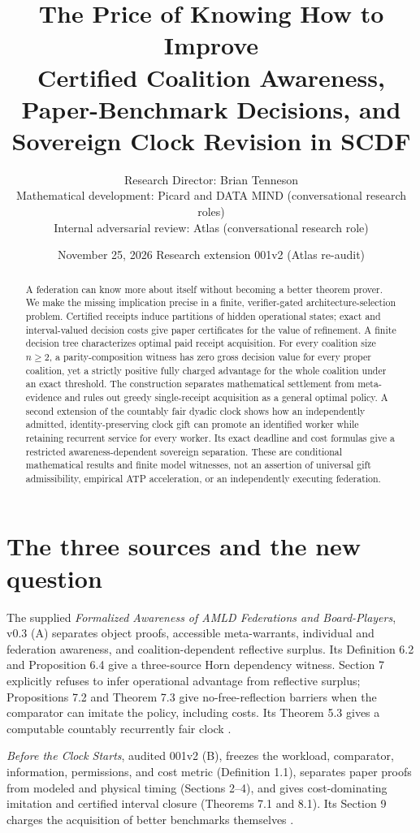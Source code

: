 \documentclass[11pt,letterpaper]{article}
\title{\textbf{The Price of Knowing How to Improve}\\[.5em]\large Certified Coalition Awareness, Paper-Benchmark Decisions, and Sovereign Clock Revision in SCDF}
\author{Research Director: Brian Tenneson\\ Mathematical development: Picard and DATA MIND (conversational research roles)\\ Internal adversarial review: Atlas (conversational research role)}
\date{November 25, 2026 \quad Research extension 001v2 (Atlas re-audit)}
\begin{document}
\maketitle
\begin{abstract}
A federation can know more about itself without becoming a better theorem prover. We make the missing implication precise in a finite, verifier-gated architecture-selection problem. Certified receipts induce partitions of hidden operational states; exact and interval-valued decision costs give paper certificates for the value of refinement. A finite decision tree characterizes optimal paid receipt acquisition. For every coalition size $n\ge2$, a parity-composition witness has zero gross decision value for every proper coalition, yet a strictly positive fully charged advantage for the whole coalition under an exact threshold. The construction separates mathematical settlement from meta-evidence and rules out greedy single-receipt acquisition as a general optimal policy. A second extension of the countably fair dyadic clock shows how an independently admitted, identity-preserving clock gift can promote an identified worker while retaining recurrent service for every worker. Its exact deadline and cost formulas give a restricted awareness-dependent sovereign separation. These are conditional mathematical results and finite model witnesses, not an assertion of universal gift admissibility, empirical ATP acceleration, or an independently executing federation.
\end{abstract}
\setcounter{tocdepth}{1}
\tableofcontents
\clearpage
\section{The three sources and the new question}
The supplied \emph{Formalized Awareness of AMLD Federations and Board-Players}, v0.3 (A) separates object proofs, accessible meta-warrants, individual and federation awareness, and coalition-dependent reflective surplus. Its Definition 6.2 and Proposition 6.4 give a three-source Horn dependency witness. Section 7 explicitly refuses to infer operational advantage from reflective surplus; Propositions 7.2 and Theorem 7.3 give no-free-reflection barriers when the comparator can imitate the policy, including costs. Its Theorem 5.3 gives a computable countably recurrently fair clock \cite{aware}.

\emph{Before the Clock Starts}, audited 001v2 (B), freezes the workload, comparator, information, permissions, and cost metric (Definition 1.1), separates paper proofs from modeled and physical timing (Sections 2--4), and gives cost-dominating imitation and certified interval closure (Theorems 7.1 and 8.1). Its Section 9 charges the acquisition of better benchmarks themselves \cite{bench}.
\end{document}
